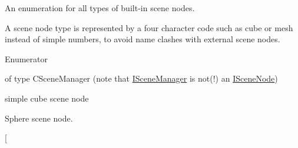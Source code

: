 An enumeration for all types of built-\/in scene nodes. 

A scene node type is represented by a four character code such as \textquotesingle{}cube\textquotesingle{} or \textquotesingle{}mesh\textquotesingle{} instead of simple numbers, to avoid name clashes with external scene nodes. \begin{Desc}
\item[Enumerator]\par
\begin{description}
\item[{\em 
E\+S\+N\+T\+\_\+\+S\+C\+E\+N\+E\+\_\+\+M\+A\+N\+A\+G\+ER\hypertarget{namespaceirr_1_1scene_acad3d7ef92a9807d391ba29120f3b7bda1280c8093ea373c7a4e2a55300d875e7}{}\label{namespaceirr_1_1scene_acad3d7ef92a9807d391ba29120f3b7bda1280c8093ea373c7a4e2a55300d875e7}
}]of type C\+Scene\+Manager (note that \hyperlink{classirr_1_1scene_1_1ISceneManager}{I\+Scene\+Manager} is not(!) an \hyperlink{classirr_1_1scene_1_1ISceneNode}{I\+Scene\+Node}) \item[{\em 
E\+S\+N\+T\+\_\+\+C\+U\+BE\hypertarget{namespaceirr_1_1scene_acad3d7ef92a9807d391ba29120f3b7bda44d66f5c284aed4d0698d6854b6a72e3}{}\label{namespaceirr_1_1scene_acad3d7ef92a9807d391ba29120f3b7bda44d66f5c284aed4d0698d6854b6a72e3}
}]simple cube scene node \item[{\em 
E\+S\+N\+T\+\_\+\+S\+P\+H\+E\+RE\hypertarget{namespaceirr_1_1scene_acad3d7ef92a9807d391ba29120f3b7bda46ad007c8d7d278a6a3769714c5dacdb}{}\label{namespaceirr_1_1scene_acad3d7ef92a9807d391ba29120f3b7bda46ad007c8d7d278a6a3769714c5dacdb}
}]Sphere scene node. \item[{\em 
}
\end{description}
\end{Desc}
